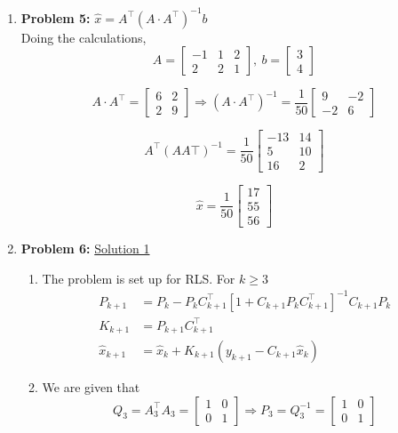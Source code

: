 \documentclass[letterpaper]{article}
\begin{document}
\begin{enumerate}
\newpage
\item \noindent \textbf{Problem 5:}
$\hat{x} = A^\top (A\cdot A^\top)^{-1} b$
\medskip\\
Doing the calculations,
$$A = \left[\begin{array}{ccc}-1 & 1 & 2 \\ 2 & 2 & 1\end{array} \right], ~ b = \begin{bmatrix} 3 \\ 4\end{bmatrix}$$

$$A\cdot A^\top = \left[\begin{array}{cc} 6 & 2\\ 2 & 9 \end{array}\right] \Rightarrow (A\cdot A^\top)^{-1} = \frac{1}{50}\left[\begin{array}{cc} 9 & -2 \\ -2 & 6\end{array}\right]$$

$$A^\top (A A\top)^{-1} = \frac{1}{50} \left[ \begin{array}{rr}-13&  14\\  5&  10\\ 16&   2\end{array} \right]   $$

$$\hat{x} = \frac{1}{50}\left[ \begin{array}{r} 17\\ 55\\ 56\end{array} \right]$$

\newpage

\item \noindent \textbf{Problem 6:}
\underline{Solution 1}
\begin{enumerate}
\setlength{\itemsep}{.1in}
\renewcommand{\labelenumi}{(\alph{enumi})}
\item The problem is set up for RLS. For $k\geq 3$
$$\begin{aligned}
P_{k+1} &= P_{k} - P_{k} C_{k+1}^\top [1+C_{k+1}P_{k}C_{k+1}^\top]^{-1}C_{k+1}P_{k}\\
K_{k+1} &= P_{k+1}C_{k+1}^\top\\
\widehat{x}_{k+1} &= \hat{x}_k +K_{k+1}(y_{k+1}-C_{k+1}\hat{x}_k)\end{aligned}$$

\item We are given that
$$Q_3 = A_3^\top A_3 = \left[\begin{array}{cc} 1 & 0 \\ 0 & 1 \end{array}\right] \Rightarrow P_3 = Q_3^{-1} = \left[\begin{array}{cc} 1 & 0 \\ 0 & 1 \end{array}\right]$$


\end{enumerate}
\end{enumerate}
\end{document}
